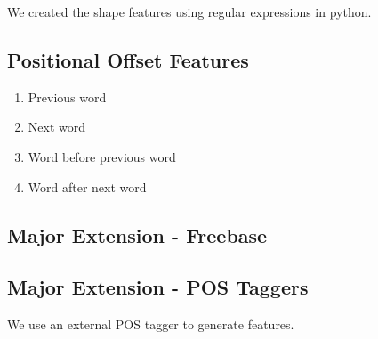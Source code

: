 \documentclass[a4paper]{article}
\begin{document}
We created the shape features using regular expressions in python. 

\subsection{Positional Offset Features}
\begin{enumerate}
\item Previous word
\item Next word
\item Word before previous word
\item Word after next word
\end{enumerate}

\subsection{Major Extension - Freebase}


\subsection{Major Extension - POS Taggers}


We use an external POS tagger to generate features.
\end{document}
